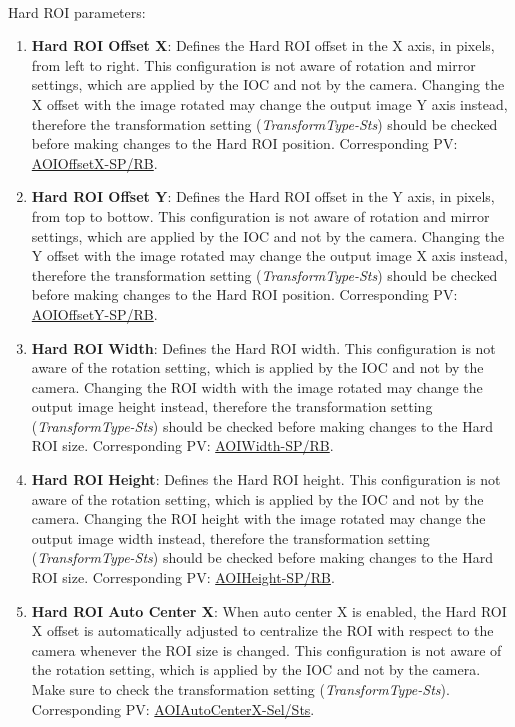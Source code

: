 \documentclass[openany]{article}
\begin{document}
        \paragraph{}Hard ROI parameters:

        \begin{enumerate}
            \item \textbf{Hard ROI Offset X}: Defines the Hard ROI offset in the X axis, in pixels, from left to right. This configuration is not aware of rotation and mirror settings, which are applied by the IOC and not by the camera. Changing the X offset with the image rotated may change the output image Y axis instead, therefore the transformation setting (\emph{TransformType-Sts}) should be checked before making changes to the Hard ROI position. Corresponding PV: \hyperlink{pv:hard-roi-off-x}{AOIOffsetX-SP/RB}.
            \item \textbf{Hard ROI Offset Y}: Defines the Hard ROI offset in the Y axis, in pixels, from top to bottow. This configuration is not aware of rotation and mirror settings, which are applied by the IOC and not by the camera. Changing the Y offset with the image rotated may change the output image X axis instead, therefore the transformation setting (\emph{TransformType-Sts}) should be checked before making changes to the Hard ROI position. Corresponding PV: \hyperlink{pv:hard-roi-off-y}{AOIOffsetY-SP/RB}.
            \item \textbf{Hard ROI Width}: Defines the Hard ROI width. This configuration is not aware of the rotation setting, which is applied by the IOC and not by the camera. Changing the ROI width with the image rotated may change the output image height instead, therefore the transformation setting (\emph{TransformType-Sts}) should be checked before making changes to the Hard ROI size. Corresponding PV: \hyperlink{pv:hard-roi-width}{AOIWidth-SP/RB}.
            \item \textbf{Hard ROI Height}: Defines the Hard ROI height. This configuration is not aware of the rotation setting, which is applied by the IOC and not by the camera. Changing the ROI height with the image rotated may change the output image width instead, therefore the transformation setting (\emph{TransformType-Sts}) should be checked before making changes to the Hard ROI size. Corresponding PV: \hyperlink{pv:hard-roi-height}{AOIHeight-SP/RB}.
            \item \textbf{Hard ROI Auto Center X}: When auto center X is enabled, the Hard ROI X offset is automatically adjusted to centralize the ROI with respect to the camera whenever the ROI size is changed. This configuration is not aware of the rotation setting, which is applied by the IOC and not by the camera. Make sure to check the transformation setting (\emph{TransformType-Sts}). Corresponding PV: \hyperlink{pv:hard-roi-auto-center-x}{AOIAutoCenterX-Sel/Sts}.

\end{enumerate}
\end{document}
